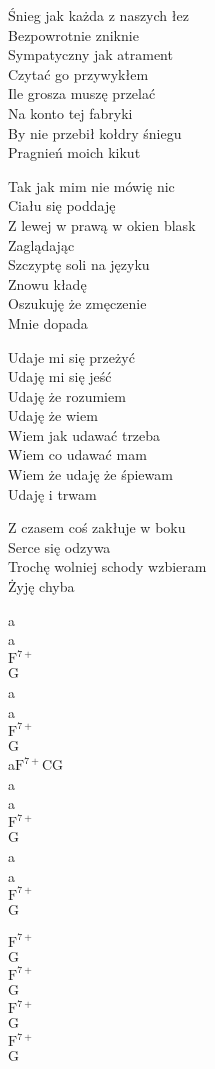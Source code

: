 \begin{text}
Śnieg jak każda z naszych łez\\
Bezpowrotnie zniknie\\
Sympatyczny jak atrament\\
Czytać go przywykłem\\
Ile grosza muszę przelać\\
Na konto tej fabryki\\
By nie przebił kołdry śniegu\\
Pragnień moich kikut

Tak jak mim nie mówię nic\\
Ciału się poddaję\\
Z lewej w prawą w okien blask\\
Zaglądając\\
Szczyptę soli na języku\\
Znowu kładę\\
Oszukuję że zmęczenie\\
Mnie dopada

Udaje mi się przeżyć\\
Udaję mi się jeść\\
Udaję że rozumiem\\
Udaję że wiem\\
Wiem jak udawać trzeba\\
Wiem co udawać mam\\
Wiem że udaję że śpiewam\\
Udaję i trwam

Z czasem coś zakłuje w boku\\
Serce się odzywa\\
Trochę wolniej schody wzbieram\\
Żyję chyba
\end{text}
\begin{chord}
    a\\
    a\\
    $\mathrm{F^{7+}}$\\
    G\\
    a\\
    a\\
    $\mathrm{F^{7+}}$\\
    G\\
    a$\mathrm{F^{7+}}$CG\\
    a\\
    a\\
    $\mathrm{F^{7+}}$\\
    G\\
    a\\
    a\\
    $\mathrm{F^{7+}}$\\
    G

    $\mathrm{F^{7+}}$\\
    G\\
    $\mathrm{F^{7+}}$\\
    G\\
    $\mathrm{F^{7+}}$\\
    G\\
    $\mathrm{F^{7+}}$\\
    G
\end{chord}
